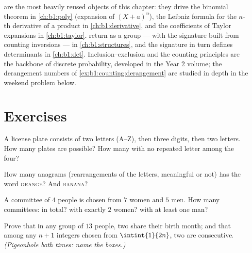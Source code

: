 \begin{remark}\label{rem:b1:counting:whereused}
 are the most heavily reused objects of this
chapter: they drive the binomial theorem in \cref{ch:b1:poly}
(expansion of $(X + a)^n$), the Leibniz formula for the $n$-th
derivative of a product in \cref{ch:b1:derivative}, and the
coefficients of Taylor expansions in \cref{ch:b1:taylor}.
 return as a group --- with the signature built from
counting inversions --- in \cref{ch:b1:structures}, and the
signature in turn defines determinants in \cref{ch:b1:det}.
Inclusion--exclusion and the counting principles are the 
backbone of discrete probability, developed in the Year 2 volume;
the derangement numbers of \cref{ex:b1:counting:derangement} are
studied in depth in the weekend problem below.
\end{remark}

\section{Exercises}

\begin{exercise}[$\star$]\label{exo:b1:counting:1}
A license plate consists of two letters (A--Z), then three digits, then
two letters. How many plates are possible? How many with no repeated
letter among the four?
\end{exercise}

\begin{exercise}[$\star$]\label{exo:b1:counting:2}
How many anagrams (rearrangements of the letters, meaningful or not)
has the word \textsc{orange}? And \textsc{banana}?
\end{exercise}

\begin{exercise}[$\star$]\label{exo:b1:counting:3}
A committee of $4$ people is chosen from $7$ women and $5$ men. How
many committees: in total? with exactly $2$ women? with at least one
man?
\end{exercise}

\begin{exercise}[$\star$]\label{exo:b1:counting:4}
Prove that in any group of $13$ people, two share their birth month;
and that among any $n + 1$ integers chosen from $\intint{1}{2n}$, two are consecutive. \emph{(Pigeonhole both times: name
the boxes.)}
\end{exercise}

